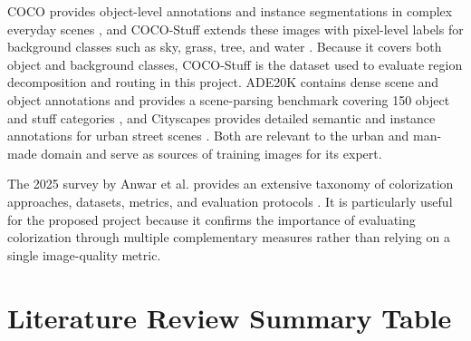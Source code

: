 \documentclass{FastFyp}
\begin{document}
COCO provides object-level annotations and instance segmentations in complex everyday scenes \cite{ref19}, and COCO-Stuff extends these images with pixel-level labels for background classes such as sky, grass, tree, and water \cite{caesar2018cocostuff}. Because it covers both object and background classes, COCO-Stuff is the dataset used to evaluate region decomposition and routing in this project. ADE20K contains dense scene and object annotations and provides a scene-parsing benchmark covering 150 object and stuff categories \cite{ref18}, and Cityscapes provides detailed semantic and instance annotations for urban street scenes \cite{ref20}. Both are relevant to the urban and man-made domain and serve as sources of training images for its expert.

The 2025 survey by Anwar et al. provides an extensive taxonomy of colorization approaches, datasets, metrics, and evaluation protocols \cite{ref21}. It is particularly useful for the proposed project because it confirms the importance of evaluating colorization through multiple complementary measures rather than relying on a single image-quality metric.


\section{Literature Review Summary Table}
\end{document}
